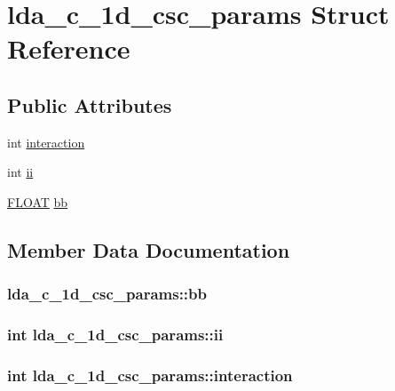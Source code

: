 \hypertarget{structlda__c__1d__csc__params}{\section{lda\-\_\-c\-\_\-1d\-\_\-csc\-\_\-params Struct Reference}
\label{structlda__c__1d__csc__params}
}
\subsection*{Public Attributes}
\begin{DoxyCompactItemize}
\item 
int \hyperlink{structlda__c__1d__csc__params_a8c60030053b03457d320322e4ace07a0}{interaction}
\item 
int \hyperlink{structlda__c__1d__csc__params_afae3b934add173a10794de38200571b4}{ii}
\item 
\hyperlink{src_2xc__config_8h_ae8690abbffa85934d64d545920e2b108}{F\-L\-O\-A\-T} \hyperlink{structlda__c__1d__csc__params_aa8172b8310ee47ec50f9e3a140609468}{bb}
\end{DoxyCompactItemize}


\subsection{Member Data Documentation}
\hypertarget{structlda__c__1d__csc__params_aa8172b8310ee47ec50f9e3a140609468}{
\subsubsection[{bb}]{ lda\-\_\-c\-\_\-1d\-\_\-csc\-\_\-params\-::bb}}\label{structlda__c__1d__csc__params_aa8172b8310ee47ec50f9e3a140609468}
\hypertarget{structlda__c__1d__csc__params_afae3b934add173a10794de38200571b4}{
\subsubsection[{ii}]{\setlength{\rightskip}{0pt plus 5cm}int lda\-\_\-c\-\_\-1d\-\_\-csc\-\_\-params\-::ii}}\label{structlda__c__1d__csc__params_afae3b934add173a10794de38200571b4}
\hypertarget{structlda__c__1d__csc__params_a8c60030053b03457d320322e4ace07a0}{
\subsubsection[{interaction}]{\setlength{\rightskip}{0pt plus 5cm}int lda\-\_\-c\-\_\-1d\-\_\-csc\-\_\-params\-::interaction}}\label{structlda__c__1d__csc__params_a8c60030053b03457d320322e4ace07a0}


